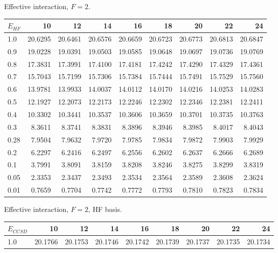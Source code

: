  
 
\begin{landscape}
\begin{table}
\begin{center}
Effective interaction, $F=2$.\\
\begin{tabular}{l|rrrrrrrr}
\hline 
$E_{HF}$ & 10 & 12 & 14 & 16 & 18 & 20 & 22 & 24 \\
\hline \hline
1.0 & 20.6295 & 20.6461 & 20.6576 & 20.6659 & 20.6723 & 20.6773 & 20.6813  & 20.6847 \\ 
0.9 & 19.0228 & 19.0391 & 19.0503 & 19.0585 & 19.0648 & 19.0697 & 19.0736  & 19.0769 \\ 
0.8 & 17.3831 & 17.3991 & 17.4100 & 17.4181 & 17.4242 & 17.4290 & 17.4329  & 17.4361 \\ 
0.7 & 15.7043 & 15.7199 & 15.7306 & 15.7384 & 15.7444 & 15.7491 & 15.7529  & 15.7560 \\ 
0.6 & 13.9781 & 13.9933 & 14.0037 & 14.0112 & 14.0170 & 14.0216 & 14.0253  & 14.0283 \\ 
0.5 & 12.1927 & 12.2073 & 12.2173 & 12.2246 & 12.2302 & 12.2346 & 12.2381  & 12.2411 \\ 
0.4 & 10.3302 & 10.3441 & 10.3537 & 10.3606 & 10.3659 & 10.3701 & 10.3735  & 10.3763 \\ 
0.3 &  8.3611 &  8.3741 &  8.3831 &  8.3896 &  8.3946 &  8.3985 &  8.4017  &  8.4043 \\ 
0.28 & 7.9504 &  7.9632 &  7.9720 &  7.9785 &  7.9834 &  7.9872 &  7.9903  &  7.9929 \\ 
0.2 &  6.2297 &  6.2416 &  6.2497 &  6.2556 &  6.2602 &  6.2637 &  6.2666  &  6.2689 \\ 
0.1 &  3.7991 &  3.8091 &  3.8159 &  3.8208 &  3.8246 &  3.8275 &  3.8299  &  3.8319 \\ 
0.05 & 2.3353 &  2.3437 &  2.3493 &  2.3534 &  2.3564 &  2.3589 &  2.3608  &  2.3624 \\ 
0.01 & 0.7659 &  0.7704 &  0.7742 &  0.7772 &  0.7793 &  0.7810 &  0.7823  &  0.7834 \\ 
\hline \hline
\end{tabular}
\end{center}
\begin{center}
Effective interaction, $F=2$, HF basis.\\
\begin{tabular}{l|rrrrrrrr}
\hline 
$E_{CCSD}$ & 10 & 12 & 14 & 16 & 18 & 20 & 22 & 24 \\
\hline \hline
1.0 & 20.1766 & 20.1753 & 20.1746 & 20.1742 & 20.1739 & 20.1737  & 20.1735 & 20.1734 \\ 

\end{tabular}
\end{center}
\end{table}
\end{landscape}
